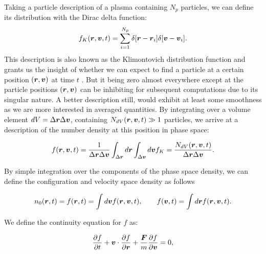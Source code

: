 Taking a particle description of a plasma containing $N_p$ particles, we can define its distribution with 
the Dirac delta function:
\begin{equation}
    f_K(\boldsymbol{r}, \boldsymbol{v}, t) = \sum_{i=1}^{N_p} \delta [ \boldsymbol{r} - \boldsymbol{r}_i ] \delta [ \boldsymbol{v} - \boldsymbol{v}_i ].
    \label{eq:klimontovich_distribution}
\end{equation}
This description is also known as the Klimontovich distribution function and grants us the insight
of whether we can expect to find a particle at a certain position $(\boldsymbol{r}, \boldsymbol{v})$ at time $t$ \cite{nicholson1983}.
But it being zero almost everywhere except at the particle positions $(\boldsymbol{r}, \boldsymbol{v})$ can be inhibiting
for subsequent computations due to its singular nature.
A better description still, would exhibit at least some smoothness as we are more interested in
averaged quantities.
By integrating over a volume element $dV = \Delta \boldsymbol{r} \Delta \boldsymbol{v}$, containing $N_{dV}(\boldsymbol{r}, \boldsymbol{v}, t)
\gg 1$ particles, we arrive at a description of the number density at this position in phase space:

\begin{equation}
    f(\boldsymbol{r}, \boldsymbol{v}, t) = \frac{1}{\Delta \boldsymbol{r} \Delta \boldsymbol{v}} \int_{\Delta \boldsymbol{r}} d\boldsymbol{r} \int_{\Delta
    \boldsymbol{v}} d\boldsymbol{v} f_K  = \frac{N_{dV}(\boldsymbol{r}, \boldsymbol{v}, t)}{\Delta \boldsymbol{r} \Delta \boldsymbol{v}}.
    \label{eq:phaseSpaceDensity}
\end{equation}

By simple integration over the components of the phase space density, we can define the configuration
and velocity space density as follows

\begin{align}
\label{eq:phasespaceIntegral}
        n_0(\boldsymbol{r},t) = f(\boldsymbol{r}, t) = \int d\boldsymbol{v} f(\boldsymbol{r}, \boldsymbol{v}, t),
    \quad \quad
        f(\boldsymbol{v}, t) = \int d\boldsymbol{r} f(\boldsymbol{r}, \boldsymbol{v}, t).
\end{align}

We define the continuity equation for $f$ as:

\begin{equation}
    \frac{\partial f}{\partial t} + \boldsymbol{v} \cdot \frac{\partial f}{\partial \boldsymbol{r}} + \frac{\boldsymbol{F}}{m}
    \frac{\partial f}{\partial \boldsymbol{v}} = 0,
    \label{eq:continuityEquation}
\end{equation}


